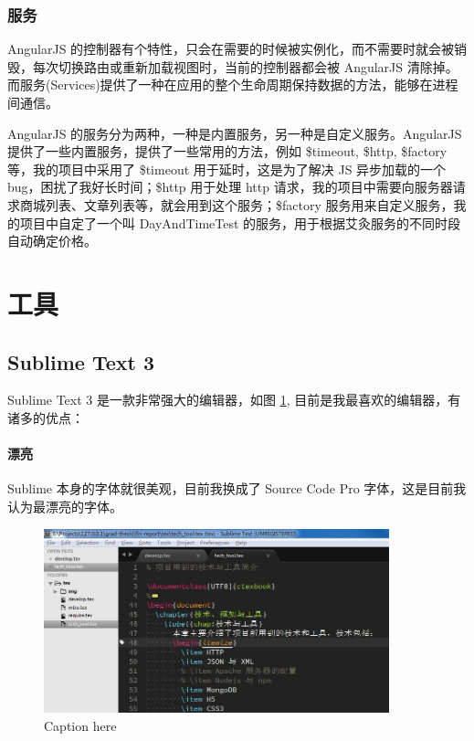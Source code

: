 \documentclass[UTF8]{ctexbook}
\begin{document}
{{            \subsubsection{服务}
              \label{subsubsec:服务}
                AngularJS 的控制器有个特性，只会在需要的时候被实例化，而不需要时就会被销毁，每次切换路由或重新加载视图时，当前的控制器都会被 AngularJS 清除掉。而服务(Services)提供了一种在应用的整个生命周期保持数据的方法，能够在进程间通信。
                \par
                AngularJS 的服务分为两种，一种是内置服务，另一种是自定义服务。AngularJS 提供了一些内置服务，提供了一些常用的方法，例如
                \$timeout, \$http, \$factory等，我的项目中采用了 \$timeout 用于延时，这是为了解决 JS 异步加载的一个 bug，困扰了我好长时间；\$http 用于处理 http 请求，我的项目中需要向服务器请求商城列表、文章列表等，就会用到这个服务；\$factory 服务用来自定义服务，我的项目中自定了一个叫 DayAndTimeTest 的服务，用于根据艾灸服务的不同时段自动确定价格。

    \section{工具}
      \label{sec:工具}
        \subsection{Sublime Text 3}
          \label{subsec:sublime_text_3}
            Sublime Text 3 是一款非常强大的编辑器，如图 \ref{fig:sublime}, 目前是我最喜欢的编辑器，有诸多的优点：
            \paragraph{漂亮} Sublime 本身的字体就很美观，目前我换成了 Source Code Pro 字体，这是目前我认为最漂亮的字体。
            \begin{figure}[H]
              \centering
              \includegraphics[width=10cm]{./img/sublime.jpg}
              \caption{Caption here}
              \label{fig:sublime}
            \end{figure}

}}
\end{document}
